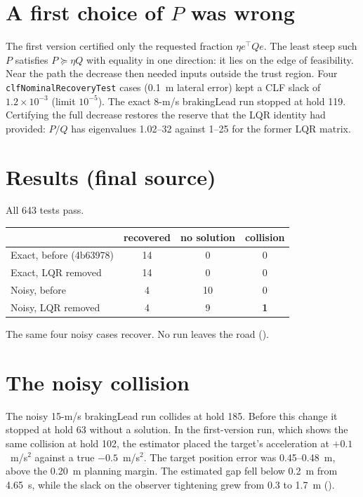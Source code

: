 \documentclass[11pt]{article}
\begin{document}
\section{A first choice of $P$ was wrong}
The first version certified only the requested fraction $\eta e^\top Qe$. The
least steep such $P$ satisfies $P\succeq\eta Q$ with equality in one direction:
it lies on the edge of feasibility. Near the path the decrease then needed
inputs outside the trust region. Four \texttt{clfNominalRecoveryTest} cases
(0.1~m lateral error) kept a CLF slack of $1.2\times10^{-3}$ (limit $10^{-5}$).
The exact 8-m/s brakingLead run stopped at hold 119. Certifying the full
decrease restores the reserve that the LQR identity had provided:
$P/Q$ has eigenvalues 1.02--32 against 1--25 for the former LQR matrix.

\section{Results (final source)}
All 643 tests pass.

\begin{center}
\begin{tabular}{lccc}
\toprule
 & recovered & no solution & collision\\
\midrule
Exact, before (4b63978) & 14 & 0 & 0\\
Exact, LQR removed & 14 & 0 & 0\\
Noisy, before & 4 & 10 & 0\\
Noisy, LQR removed & 4 & 9 & \textbf{1}\\
\bottomrule
\end{tabular}
\end{center}
The same four noisy cases recover. No run leaves the road
().

\section{The noisy collision}
The noisy 15-m/s brakingLead run collides at hold 185. Before this change it
stopped at hold 63 without a solution. In the first-version run, which shows the
same collision at hold 102, the estimator placed the target's acceleration at
$+0.1$~m/s$^2$ against a true $-0.5$~m/s$^2$. The target position error was
0.45--0.48~m, above the 0.20~m planning margin. The estimated gap fell below
0.2~m from 4.65~s, while the slack on the observer tightening grew from 0.3 to
1.7~m ().
\end{document}
